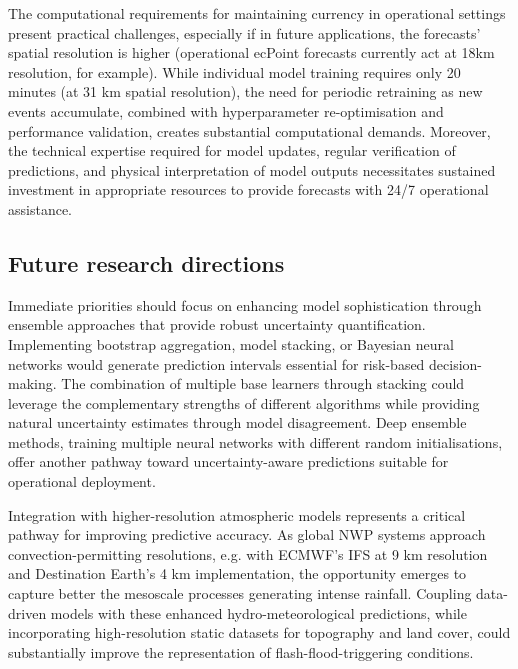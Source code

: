 The computational requirements for maintaining currency in operational settings present practical challenges, especially if in future applications, the forecasts' spatial resolution is higher (operational ecPoint forecasts currently act at 18km resolution, for example). While individual model training requires only 20 minutes (at 31 km spatial resolution), the need for periodic retraining as new events accumulate, combined with hyperparameter re-optimisation and performance validation, creates substantial computational demands. Moreover, the technical expertise required for model updates, regular verification of predictions, and physical interpretation of model outputs necessitates sustained investment in appropriate resources to provide forecasts with 24/7 operational assistance.


\subsection{Future research directions}

Immediate priorities should focus on enhancing model sophistication through ensemble approaches that provide robust uncertainty quantification. Implementing bootstrap aggregation, model stacking, or Bayesian neural networks would generate prediction intervals essential for risk-based decision-making. The combination of multiple base learners through stacking could leverage the complementary strengths of different algorithms while providing natural uncertainty estimates through model disagreement. Deep ensemble methods, training multiple neural networks with different random initialisations, offer another pathway toward uncertainty-aware predictions suitable for operational deployment.

Integration with higher-resolution atmospheric models represents a critical pathway for improving predictive accuracy. As global NWP systems approach convection-permitting resolutions, e.g. with ECMWF's IFS at 9 km resolution and Destination Earth's 4 km implementation, the opportunity emerges to capture better the mesoscale processes generating intense rainfall. Coupling data-driven models with these enhanced hydro-meteorological predictions, while incorporating high-resolution static datasets for topography and land cover, could substantially improve the representation of flash-flood-triggering conditions. 

